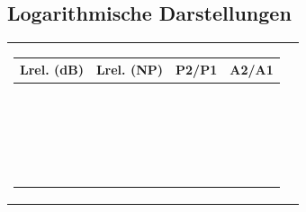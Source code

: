 \subsection{Logarithmische Darstellungen}
\renewcommand{\arraystretch}{1.2}
\begin{tabular}{ll}
	\parbox{7cm}{
		\scriptsize
		\begin{tabular}{|c|c|c|c|}
			\hline
			\textbf{Lrel. (dB)} & \textbf{Lrel. (NP)} & \textbf{P2/P1} & \textbf{A2/A1} \\ \hline
			$100.000$ & $11.513$ & $10^{10}$ & $10^5$ \\ \hline
			$90.000$ & $10.362$ & $10^9$ & $31622.777$ \\ \hline
			$80.000$ & $9.210$ & $10^8$ & $10^4$ \\ \hline
			$70.000$ & $8.059$ & $10^7$ & $3162.278$ \\ \hline
			$60.000$ & $6.908$ & $10^6$ & $10^3$ \\ \hline
			$50.000$ & $5.756$ & $10^5$ & $316.228$ \\ \hline
			$40.000$ & $4.605$ & $10^4$ & $10^2$ \\ \hline
			$30.000$ & $3.454$ & $10^3$ & $31.623$ \\ \hline
			\textbf{$20.000$} & $2.303$ & \textbf{$10^2$} & \textbf{$10.000$} \\ \hline
			$19.085$ & $2.197$ & $81.000$ & $9.000$ \\ \hline
			$19.000$ & $2.187$ & $79.433$ & $8.913$ \\ \hline
			$18.062$ & $2.079$ & $64.000$ & $8.000$ \\ \hline
			$18.000$ & $2.072$ & $63.096$ & $7.943$ \\ \hline
			$17.000$ & $1.957$ & $50.119$ & $7.079$ \\ \hline
			$16.902$ & $1.946$ & $49.000$ & $7.000$ \\ \hline
			$16.000$ & $1.842$ & $39.811$ & $6.310$ \\ \hline
			$15.563$ & $1.792$ & $36.000$ & $6.000$ \\ \hline
			$15.000$ & $1.727$ & $31.623$ & $5.623$ \\ \hline
			$14.000$ & $1.612$ & $25.119$ & $5.012$ \\ \hline
			\textbf{$13.979$} & $1.609$ & \textbf{$25.000$} & \textbf{$5.000$} \\ \hline
			$13.000$ & $1.497$ & $19.953$ & $4.467$ \\ \hline
			\textbf{$12.041$} & $1.386$ & \textbf{$16.000$} & \textbf{$4.000$} \\ \hline

\end{tabular}}
\end{tabular}
